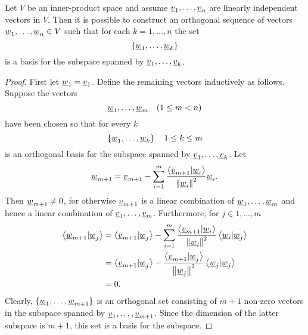 \begin{theorem}
Let $V$ be an inner-product space and assume $\underline{v}_1, \ldots, \underline{v}_n$ are linearly independent vectors in $V$.
Then it is possible to construct an orthogonal sequence of vectors $\underline{w}_1, \ldots, \underline{w}_n \in V$ such that for each $k = 1, \ldots, n$ the set
\begin{equation*}
\left\{ \underline{w}_1, \ldots, \underline{w}_k \right\}
\end{equation*}
is a basis for the subspace spanned by $\underline{v}_1, \ldots, \underline{v}_k$.
\end{theorem}
\begin{proof}
First let $\underline{w}_1 = \underline{v}_1$.
Define the remaining vectors inductively as follows.
Suppose the vectors
\begin{equation*}
\underline{w}_1, \ldots, \underline{w}_m \quad (1 \leq m < n)
\end{equation*}
have been chosen so that for every $k$
\begin{equation*}
\left\{ \underline{w}_1, \ldots, \underline{w}_k \right\} \quad 1 \leq k \leq m
\end{equation*}
is an orthogonal basis for the subspace spanned by $\underline{v}_1, \ldots, \underline{v}_k$.
Let
\begin{equation*}
\underline{w}_{m+1} = \underline{v}_{m+1} - \sum_{i=1}^m \frac{ \left\langle \underline{v}_{m+1} | \underline{w}_i \right\rangle } { \left\| \underline{w}_i \right\|^2 } \underline{w}_i.
\end{equation*}
Then $\underline{w}_{m+1} \neq 0$, for otherwise $\underline{v}_{m+1}$ is a linear combination of $\underline{w}_1, \ldots, \underline{w}_m$ and hence a linear combination of $\underline{v}_1, \ldots, \underline{v}_m$.
Furthermore, for $j \in 1, \ldots, m$
\begin{equation*}
\begin{split}
\left\langle \underline{w}_{m+1} | \underline{w}_j \right\rangle
&= \left\langle \underline{v}_{m+1} | \underline{w}_j \right\rangle
- \sum_{i=1}^m \frac{ \left\langle \underline{v}_{m+1} | \underline{w}_i \right\rangle } { \left\| \underline{w}_i \right\|^2 }
\left\langle \underline{w}_i | \underline{w}_j \right\rangle \\
&= \left\langle \underline{v}_{m+1} | \underline{w}_j \right\rangle
- \frac{ \left\langle \underline{v}_{m+1} | \underline{w}_j \right\rangle } { \left\| \underline{w}_j \right\|^2 }
\left\langle \underline{w}_j | \underline{w}_j \right\rangle \\
&= 0.
\end{split}
\end{equation*}
Clearly, $\{ \underline{w}_1, \ldots, \underline{w}_{m+1} \}$ is an orthogonal set consisting of $m+1$ non-zero vectors in the subspace spanned by $\underline{v}_1, \ldots, \underline{v}_{m+1}$.
Since the dimension of the latter subspace is $m+1$, this set is a basis for the subspace.
\end{proof}

